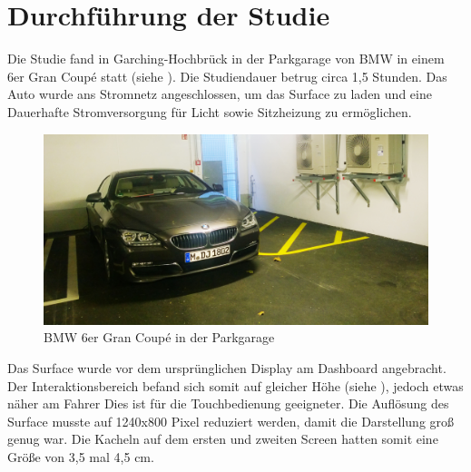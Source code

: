\section{Durchführung der Studie}
Die Studie fand in Garching-Hochbrück in der Parkgarage von BMW in einem 6er Gran Coupé statt (siehe ). 
Die Studiendauer betrug circa 1,5 Stunden. 
Das Auto wurde ans Stromnetz angeschlossen, um das Surface zu laden und eine Dauerhafte Stromversorgung für Licht sowie Sitzheizung zu ermöglichen.
\begin{figure}[ht]
  \centering
  \includegraphics[width=1\textwidth]{img/GranCoupe.jpg}
  \caption{BMW 6er Gran Coupé in der Parkgarage}
  \label{fig:GranCoupe}
\end{figure} 
Das Surface wurde vor dem ursprünglichen Display am Dashboard angebracht. 
Der Interaktionsbereich befand sich somit auf gleicher Höhe (siehe ), jedoch etwas näher am Fahrer
Dies ist für die Touchbedienung geeigneter. 
Die Auflösung des Surface musste auf 1240x800 Pixel reduziert werden, damit die Darstellung groß genug war. 
Die Kacheln auf dem ersten und zweiten Screen hatten somit eine Größe von 3,5 mal 4,5 cm. 

